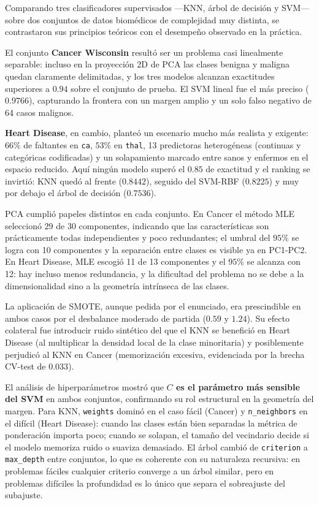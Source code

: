 Comparando tres clasificadores supervisados ---KNN, árbol de decisión y SVM---
sobre dos conjuntos de datos biomédicos de complejidad muy distinta, se
contrastaron sus principios teóricos con el desempeño observado en la
práctica.

El conjunto \textbf{Cancer Wisconsin} resultó ser un problema casi
linealmente separable: incluso en la proyección 2D de PCA las clases benigna
y maligna quedan claramente delimitadas, y los tres modelos alcanzan
exactitudes superiores a $0.94$ sobre el conjunto de prueba. El SVM lineal
fue el más preciso ($0.9766$), capturando la frontera con un margen amplio
y un solo falso negativo de 64 casos malignos.

\textbf{Heart Disease}, en cambio, planteó un escenario mucho más realista
y exigente: $66\%$ de faltantes en \texttt{ca}, $53\%$ en \texttt{thal}, 13
predictoras heterogéneas (continuas y categóricas codificadas) y un
solapamiento marcado entre sanos y enfermos en el espacio reducido. Aquí
ningún modelo superó el $0.85$ de exactitud y el ranking se invirtió: KNN
quedó al frente ($0.8442$), seguido del SVM-RBF ($0.8225$) y muy por
debajo el árbol de decisión ($0.7536$).

PCA cumplió papeles distintos en cada conjunto. En Cancer el método MLE
seleccionó 29 de 30 componentes, indicando que las características son
prácticamente todas independientes y poco redundantes; el umbral del $95\%$
se logra con 10 componentes y la separación entre clases es visible ya en
PC1-PC2. En Heart Disease, MLE escogió 11 de 13 componentes y el $95\%$ se
alcanza con 12: hay incluso menos redundancia, y la dificultad del problema
no se debe a la dimensionalidad sino a la geometría intrínseca de las
clases.

La aplicación de SMOTE, aunque pedida por el enunciado, era prescindible
en ambos casos por el desbalance moderado de partida ($0.59$ y $1.24$).
Su efecto colateral fue introducir ruido sintético del que el KNN se
benefició en Heart Disease (al multiplicar la densidad local de la clase
minoritaria) y posiblemente perjudicó al KNN en Cancer (memorización
excesiva, evidenciada por la brecha CV-test de $0.033$).

El análisis de hiperparámetros mostró que \textbf{$C$ es el parámetro más
    sensible del SVM} en ambos conjuntos, confirmando su rol estructural en
la geometría del margen. Para KNN, \texttt{weights} dominó en el caso
fácil (Cancer) y \texttt{n\_neighbors} en el difícil (Heart Disease):
cuando las clases están bien separadas la métrica de ponderación importa
poco; cuando se solapan, el tamaño del vecindario decide si el modelo
memoriza ruido o suaviza demasiado. El árbol cambió de \texttt{criterion} a
\texttt{max\_depth} entre conjuntos, lo que es coherente con su naturaleza
recursiva: en problemas fáciles cualquier criterio converge a un árbol
similar, pero en problemas difíciles la profundidad es lo único que separa
el sobreajuste del subajuste.

